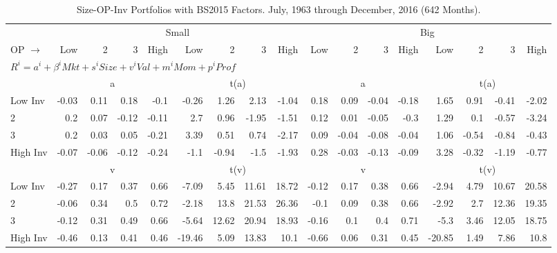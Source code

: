 
\begin{table}[!ht]
\centering
\caption{Size-OP-Inv Portfolios with BS2015 Factors. \footnotesize{July, 1963 through December, 2016 (642 Months).}}
\begin{tabular}{lrrrrrrrrrrrrrrrr}
  \toprule
    & \multicolumn{8}{c}{Small} & \multicolumn{8}{c}{Big} \\
      \cmidrule(r){2-9} \cmidrule(r){10-17}
    OP $\rightarrow$ & Low & 2 & 3 & High & Low & 2 & 3 & High & Low & 2 & 3 & High & Low & 2 & 3 & High \\ 
  \midrule
  \multicolumn{17}{l}{$R^i=a^i+\beta^iMkt+s^iSize+v^iVal+m^iMom+p^iProf$} \\

  
    
      & \multicolumn{4}{c}{a} & \multicolumn{4}{c}{t(a)}
    
      & \multicolumn{4}{c}{a} & \multicolumn{4}{c}{t(a)}
    
    \\
      \cmidrule(r){2-5} \cmidrule(r){6-9} \cmidrule(r){10-13} \cmidrule(r){14-17}

    Low Inv   & -0.03  & 0.11  & 0.18  & -0.1  & -0.26  & 1.26  & 2.13  & -1.04  & 0.18  & 0.09  & -0.04  & -0.18  & 1.65  & 0.91  & -0.41  & -2.02  \\
           2  & 0.2  & 0.07  & -0.12  & -0.11  & 2.7  & 0.96  & -1.95  & -1.51  & 0.12  & 0.01  & -0.05  & -0.3  & 1.29  & 0.1  & -0.57  & -3.24  \\
           3  & 0.2  & 0.03  & 0.05  & -0.21  & 3.39  & 0.51  & 0.74  & -2.17  & 0.09  & -0.04  & -0.08  & -0.04  & 1.06  & -0.54  & -0.84  & -0.43  \\
    High Inv  & -0.07  & -0.06  & -0.12  & -0.24  & -1.1  & -0.94  & -1.5  & -1.93  & 0.28  & -0.03  & -0.13  & -0.09  & 3.28  & -0.32  & -1.19  & -0.77  \\

  
    
      & \multicolumn{4}{c}{v} & \multicolumn{4}{c}{t(v)}
    
      & \multicolumn{4}{c}{v} & \multicolumn{4}{c}{t(v)}
    
    \\
      \cmidrule(r){2-5} \cmidrule(r){6-9} \cmidrule(r){10-13} \cmidrule(r){14-17}

    Low Inv   & -0.27  & 0.17  & 0.37  & 0.66  & -7.09  & 5.45  & 11.61  & 18.72  & -0.12  & 0.17  & 0.38  & 0.66  & -2.94  & 4.79  & 10.67  & 20.58  \\
           2  & -0.06  & 0.34  & 0.5  & 0.72  & -2.18  & 13.8  & 21.53  & 26.36  & -0.1  & 0.09  & 0.38  & 0.66  & -2.92  & 2.7  & 12.36  & 19.35  \\
           3  & -0.12  & 0.31  & 0.49  & 0.66  & -5.64  & 12.62  & 20.94  & 18.93  & -0.16  & 0.1  & 0.4  & 0.71  & -5.3  & 3.46  & 12.05  & 18.75  \\
    High Inv  & -0.46  & 0.13  & 0.41  & 0.46  & -19.46  & 5.09  & 13.83  & 10.1  & -0.66  & 0.06  & 0.31  & 0.45  & -20.85  & 1.49  & 7.86  & 10.8  \\


\end{tabular}
\end{table}
